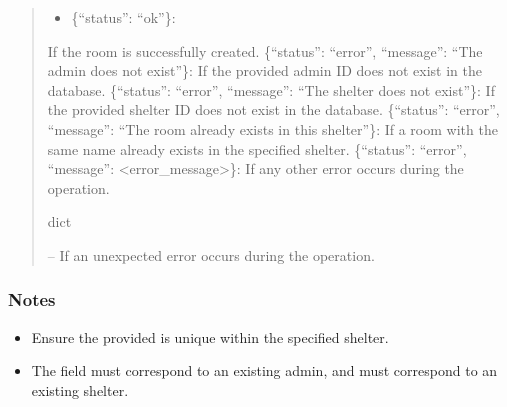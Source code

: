 \documentclass[letterpaper,10pt,english]{sphinxmanual}
\begin{document}
\begin{fulllineitems}
\begin{fulllineitems}
\begin{quote}
\begin{description}
\begin{itemize}
\end{itemize}

\sphinxAtStartPar
\begin{description}
\begin{itemize}
\item {} 
\sphinxAtStartPar
\{“status”: “ok”\}:

\end{itemize}

\sphinxAtStartPar
If the room is successfully created.
\sphinxhyphen{} \{“status”: “error”, “message”: “The admin does not exist”\}:
If the provided admin ID does not exist in the database.
\sphinxhyphen{} \{“status”: “error”, “message”: “The shelter does not exist”\}:
If the provided shelter ID does not exist in the database.
\sphinxhyphen{} \{“status”: “error”, “message”: “The room already exists in this shelter”\}:
If a room with the same name already exists in the specified shelter.
\sphinxhyphen{} \{“status”: “error”, “message”: <error\_message>\}:
If any other error occurs during the operation.

\end{description}


\sphinxAtStartPar
dict

\sphinxAtStartPar
{} – If an unexpected error occurs during the operation.

\end{description}\end{quote}
\subsubsection*{Notes}
\begin{itemize}
\item {} 
\sphinxAtStartPar
Ensure the provided  is unique within the specified shelter.

\item {} 
\sphinxAtStartPar
The  field must correspond to an existing admin, and  must correspond to an existing shelter.

\end{itemize}

\end{fulllineitems}



\end{fulllineitems}
\end{document}
